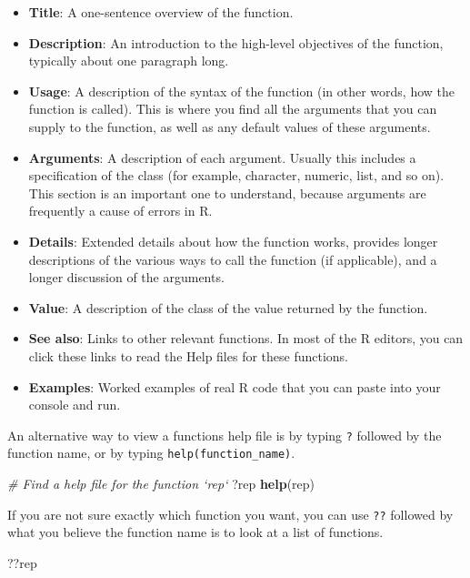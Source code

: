 \documentclass[
]{book}
\newenvironment{Shaded}{\begin{snugshade}}{\end{snugshade}}
\newcommand{\CommentTok}[1]{\textcolor[rgb]{0.56,0.35,0.01}{\textit{#1}}}
\newcommand{\KeywordTok}[1]{\textcolor[rgb]{0.13,0.29,0.53}{\textbf{#1}}}
\newcommand{\NormalTok}[1]{#1}
\begin{document}
\begin{itemize}
\item
  \textbf{Title}: A one-sentence overview of the function.
\item
  \textbf{Description}: An introduction to the high-level objectives of the function, typically about one paragraph long.
\item
  \textbf{Usage}: A description of the syntax of the function (in other words, how the function is called). This is where you find all the arguments that you can supply to the function, as well as any default values of these arguments.
\item
  \textbf{Arguments}: A description of each argument. Usually this includes a specification of the class (for example, character, numeric, list, and so on). This section is an important one to understand, because arguments are frequently a cause of errors in R.
\item
  \textbf{Details}: Extended details about how the function works, provides longer descriptions of the various ways to call the function (if applicable), and a longer discussion of the arguments.
\item
  \textbf{Value}: A description of the class of the value returned by the function.
\item
  \textbf{See also}: Links to other relevant functions. In most of the R editors, you can click these links to read the Help files for these functions.
\item
  \textbf{Examples}: Worked examples of real R code that you can paste into your console and run.
\end{itemize}

An alternative way to view a functions help file is by typing \texttt{?} followed by the function name, or by typing \texttt{help(function\_name)}.

\begin{Shaded}
\begin{Highlighting}[]
\CommentTok{# Find a help file for the function `rep`}
\NormalTok{?rep}
\KeywordTok{help}\NormalTok{(rep)}
\end{Highlighting}
\end{Shaded}

If you are not sure exactly which function you want, you can use \texttt{??} followed by what you believe the function name is to look at a list of functions.

\begin{Shaded}
\begin{Highlighting}[]
\NormalTok{??rep}
\end{Highlighting}
\end{Shaded}
\end{document}
